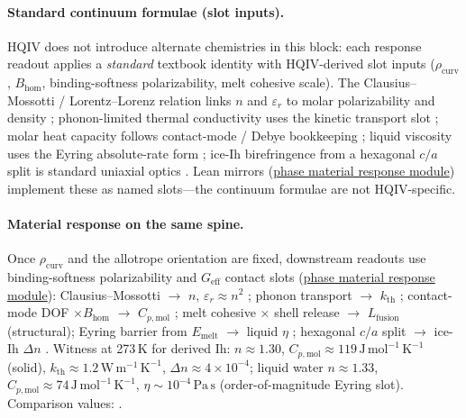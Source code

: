 \documentclass[11pt,notitlepage]{amsart}
\begin{document}
\paragraph{Standard continuum formulae (slot inputs).}
HQIV does not introduce alternate chemistries in this block: each response readout
applies a \emph{standard} textbook identity with HQIV-derived slot inputs
($\rho_{\mathrm{curv}}$, $B_{\mathrm{hom}}$, binding-softness polarizability, melt
cohesive scale). The Clausius--Mossotti / Lorentz--Lorenz relation links $n$ and
$\varepsilon_r$ to molar polarizability and density
\cite{hecht2017optics,jackson1999}; phonon-limited thermal conductivity uses the
kinetic transport slot \cite{ashcroft1976ssp}; molar heat capacity follows
contact-mode / Debye bookkeeping \cite{ashcroft1976ssp,atkins2018pchem}; liquid
viscosity uses the Eyring absolute-rate form
\cite{eyring1936viscosity,atkins2018pchem}; ice-Ih birefringence from a hexagonal
$c/a$ split is standard uniaxial optics \cite{hecht2017optics,petrenko2002ice}.
Lean mirrors (\hyperref[lean:phase-material-response]{phase material response module})
implement these as named slots---the continuum formulae are not HQIV-specific.

\paragraph{Material response on the same spine.}
Once $\rho_{\mathrm{curv}}$ and the allotrope orientation are fixed, downstream
readouts use binding-softness polarizability and $G_{\mathrm{eff}}$ contact slots
(\hyperref[lean:phase-material-response]{phase material response module}):
Clausius--Mossotti $\rightarrow$ $n$, $\varepsilon_r\approx n^2$ \cite{hecht2017optics};
phonon transport $\rightarrow$ $k_{\mathrm{th}}$ \cite{ashcroft1976ssp};
contact-mode DOF $\times B_{\mathrm{hom}}$ $\rightarrow$ $C_{p,\mathrm{mol}}$
\cite{ashcroft1976ssp,atkins2018pchem}; melt cohesive $\times$ shell release
$\rightarrow$ $L_{\mathrm{fusion}}$ (structural); Eyring barrier from $E_{\mathrm{melt}}$
$\rightarrow$ liquid $\eta$ \cite{eyring1936viscosity,atkins2018pchem}; hexagonal
$c/a$ split $\rightarrow$ ice-Ih $\Delta n$ \cite{hecht2017optics,petrenko2002ice}.
Witness at 273\,K for derived Ih: $n\approx 1.30$, $C_{p,\mathrm{mol}}\approx 119\,\mathrm{J\,mol^{-1}\,K^{-1}}$
(solid), $k_{\mathrm{th}}\approx 1.2\,\mathrm{W\,m^{-1}\,K^{-1}}$,
$\Delta n\approx 4\times 10^{-4}$; liquid water $n\approx 1.33$,
$C_{p,\mathrm{mol}}\approx 74\,\mathrm{J\,mol^{-1}\,K^{-1}}$,
$\eta\sim 10^{-4}\,\mathrm{Pa\,s}$ (order-of-magnitude Eyring slot). Comparison values:
\cite{nistwebbook_h2o,crc2023handbook,petrenko2002ice}.
\end{document}
